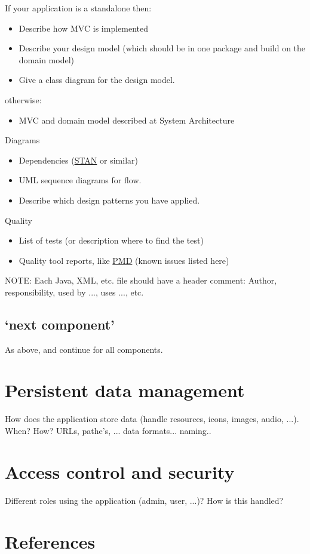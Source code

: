 \documentclass[12pt,a4paper]{scrartcl}
\begin{document}
If your application is a standalone then:
\begin{itemize}
  \item Describe how MVC is implemented
  \item Describe your design model (which should be in one package and
    build on the domain model)
  \item Give a class diagram for the design model.
\end{itemize}
otherwise:
\begin{itemize}
  \item MVC and domain model described at System Architecture
\end{itemize}

Diagrams
\begin{itemize}
  \item Dependencies (\href{http://stan4j.com/}{STAN} or similar)
  \item UML sequence diagrams for flow.
  \item Describe which design patterns you have applied.
\end{itemize}

Quality
\begin{itemize}
  \item List of tests (or description where to find the test)
  \item Quality tool reports, like \href{http://filehippo.com/download_pmd/}{PMD} (known issues listed here)
\end{itemize}

NOTE: Each Java, XML, etc. file should have a header comment: Author,
responsibility, used by ..., uses ..., etc.

\subsection{`next component'}

As above, and continue for all components.


\section{Persistent data management}

How does the application store data (handle resources, icons, images, audio,
...). When? How? URLs, pathe’s, ... data formats... naming..


\section{Access control and security}

Different roles using the application (admin, user, ...)? How is this handled?


\section{References}
\end{document}
